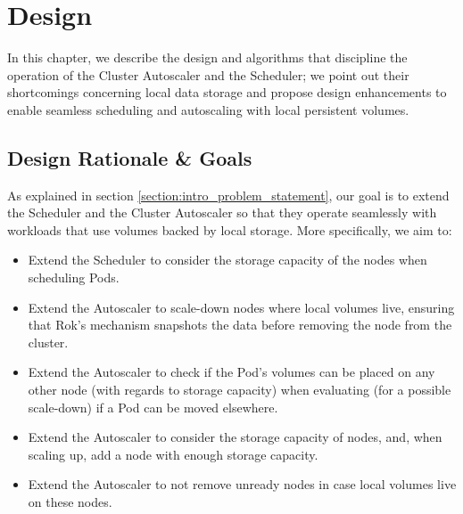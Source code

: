 \chapter{Design} \label{chapter:design}

In this chapter, we describe the design and algorithms that discipline the
operation of the Cluster Autoscaler and the Scheduler; we point out their
shortcomings concerning local data storage and propose design enhancements to
enable seamless scheduling and autoscaling with local persistent volumes.

\section{Design Rationale \& Goals}

As explained in section \ref{section:intro_problem_statement}, our goal is to
extend the Scheduler and the Cluster Autoscaler so that they operate seamlessly
with workloads that use volumes backed by local storage. More specifically, we
aim to:

\begin{itemize}
      \tightlist
      \item Extend the Scheduler to consider the storage capacity of the nodes
            when scheduling Pods.
      \item Extend the Autoscaler to scale-down nodes where local volumes live,
            ensuring that Rok's mechanism snapshots the data before removing the
            node from the cluster.
      \item Extend the Autoscaler to check if the Pod's volumes can be placed on
            any other node (with regards to storage capacity) when evaluating (for
            a possible scale-down) if a Pod can be moved elsewhere.
      \item Extend the Autoscaler to consider the storage capacity of nodes, and,
            when scaling up, add a node with enough storage capacity.
      \item Extend the Autoscaler to not remove unready nodes in case local
            volumes live on these nodes.
\end{itemize}




